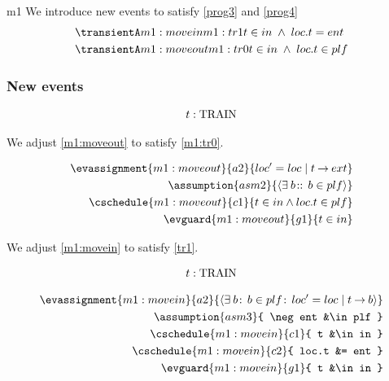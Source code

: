 \documentclass[12pt]{amsart}
\begin{document}
\begin{machine}{m1}
We introduce new events to satisfy \eqref{prog3} and \eqref{prog4}
\begin{align*}
& \transient{m1:movein}{0}{m1:tr1}
	{ t \in in \1\land loc.t = ent }
\\ & \transient{m1:moveout}{0}{m1:tr0}
	{ t \in in \1\land loc.t \in plf }
\end{align*}


\subsubsection{New events} 


\begin{align*}
\indices{m1:moveout}{	t : \Train}
\end{align*}

We adjust \ref{m1:moveout} to satisfy \ref{m1:tr0}.


\begin{align*}
\evassignment{m1:moveout}{a2}{ loc' = loc \1 | t \tfun ext }
\\ \assumption{asm2}
	{ \qexists{b}{}{b \in plf} }
\\ \cschedule{m1:moveout}{c1}{ t \in in \land loc.t \in plf }
\\ \evguard{m1:moveout}{g1}{ t \in in }
\end{align*}

We adjust \ref{m1:movein} to satisfy \ref{tr1}.


\begin{align*}
\indices{m1:movein}{	t : \Train}
\end{align*}

\begin{align*}
\evassignment{m1:movein}{a2}
	{ \qexists{b}{b \in plf }{ loc' = loc \1| t \tfun b } }
\\ \assumption{asm3}
	{ \neg ent &\in plf }
\\ \cschedule{m1:movein}{c1}{ t &\in in } 
\\ \cschedule{m1:movein}{c2}{ loc.t &= ent }
\\ \evguard{m1:movein}{g1}{ t &\in in }
\end{align*}
%
\end{machine}
\end{document}
